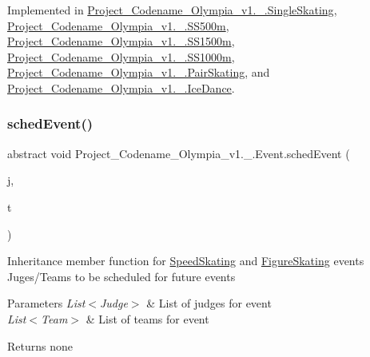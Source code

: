 Implemented in \hyperlink{classProject__Codename__Olympia__v1_1_1__0_1_1SingleSkating_abf63b846664f64fe96a68a05787f79aa}{Project\+\_\+\+Codename\+\_\+\+Olympia\+\_\+v1.\+\_.\+Single\+Skating}, \hyperlink{classProject__Codename__Olympia__v1_1_1__0_1_1SS500m_a28582161ab61bb80635656e48ebfc664}{Project\+\_\+\+Codename\+\_\+\+Olympia\+\_\+v1.\+\_.\+S\+S500m}, \hyperlink{classProject__Codename__Olympia__v1_1_1__0_1_1SS1500m_a749ab5adb7bd98da6e7370fef95d46fd}{Project\+\_\+\+Codename\+\_\+\+Olympia\+\_\+v1.\+\_.\+S\+S1500m}, \hyperlink{classProject__Codename__Olympia__v1_1_1__0_1_1SS1000m_ab08df1d91a7685c6d1dc9bdec0d45fba}{Project\+\_\+\+Codename\+\_\+\+Olympia\+\_\+v1.\+\_.\+S\+S1000m}, \hyperlink{classProject__Codename__Olympia__v1_1_1__0_1_1PairSkating_a5150348cf16352d2ce4ae63ac4e8a44d}{Project\+\_\+\+Codename\+\_\+\+Olympia\+\_\+v1.\+\_.\+Pair\+Skating}, and \hyperlink{classProject__Codename__Olympia__v1_1_1__0_1_1IceDance_a9c1268bc83034220bd16102d6cd66b11}{Project\+\_\+\+Codename\+\_\+\+Olympia\+\_\+v1.\+\_.\+Ice\+Dance}.

\mbox{\label{classProject__Codename__Olympia__v1_1_1__0_1_1Event_abb4e2b9c28527b9a28395f2fe9192196}} 
\subsubsection{\texorpdfstring{sched\+Event()}{schedEvent()}}
{\footnotesize\ttfamily abstract void Project\+\_\+\+Codename\+\_\+\+Olympia\+\_\+v1.\+\_.\+Event.\+sched\+Event (\begin{DoxyParamCaption}\item[{List$<$ \hyperlink{classProject__Codename__Olympia__v1_1_1__0_1_1Judge}{Judge} $>$}]{j,  }\item[{List$<$ \hyperlink{classProject__Codename__Olympia__v1_1_1__0_1_1Team}{Team} $>$}]{t }\end{DoxyParamCaption})\hspace{0.3cm}{\ttfamily [pure virtual]}}

Inheritance member function for \hyperlink{classProject__Codename__Olympia__v1_1_1__0_1_1SpeedSkating}{Speed\+Skating} and \hyperlink{classProject__Codename__Olympia__v1_1_1__0_1_1FigureSkating}{Figure\+Skating} events Juges/\+Teams to be scheduled for future events 
\begin{DoxyParams}{Parameters}
{\em List$<$\+Judge$>$} & List of judges for event \\
\hline
{\em List$<$\+Team$>$} & List of teams for event \\
\hline
\end{DoxyParams}
\begin{DoxyReturn}{Returns}
none 
\end{DoxyReturn}


